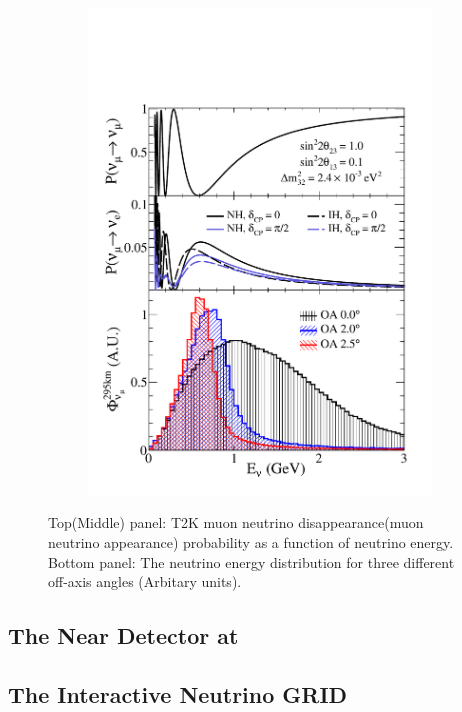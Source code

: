 \begin{figure}[h]
  \begin{subfigure}[t]{0.7\textwidth}
    \includegraphics[width=\textwidth, trim={0mm 0mm 0mm 0mm}, clip,page=1]{Figures/Detectors/T2KOffAxisTrick.pdf}
  \end{subfigure}
    \caption{Top(Middle) panel: T2K muon neutrino disappearance(muon neutrino appearance) probability as a function of neutrino energy. Bottom panel: The neutrino energy distribution for three different off-axis angles (Arbitary units).}
  \label{fig:T2KSKExp_T2K_OffAxisTrick}
\end{figure}

\subsection{The Near Detector at }
\label{subsec:T2KSKExp_T2K_ND280}

\subsection{The Interactive Neutrino GRID}
\label{subsec:T2KSKExp_T2K_INGRID}
